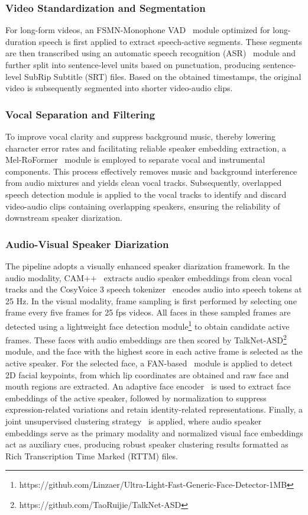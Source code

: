 \documentclass{article}
\begin{document}
\subsubsection{Video Standardization and Segmentation}
For long-form videos, an FSMN-Monophone VAD~\cite{VAD} module optimized for long-duration speech is first applied to extract speech-active segments. 
These segments are then transcribed using an automatic speech recognition (ASR)~\cite{FunASR} module and 
further split into sentence-level units based on punctuation, 
producing sentence-level SubRip Subtitle (SRT) files.
Based on the obtained timestamps, the original video is subsequently segmented into shorter video-audio clips.

\subsubsection{Vocal Separation and Filtering}
To improve vocal clarity and suppress background music, 
thereby lowering character error rates and facilitating reliable speaker embedding extraction, 
a Mel-RoFormer~\cite{Mel-RoFormer} module is employed to separate vocal and instrumental components. 
This process effectively removes music and background interference from audio mixtures and yields clean vocal tracks. 
Subsequently, overlapped speech detection module is applied to the vocal tracks 
to identify and discard video-audio clips containing overlapping speakers, 
ensuring the reliability of downstream speaker diarization.

\subsubsection{Audio-Visual Speaker Diarization}
The pipeline adopts a visually enhanced speaker diarization framework.
In the audio modality, CAM++~\cite{CAM++} extracts audio speaker embeddings from clean vocal tracks 
and the CosyVoice 3 speech tokenizer~\cite{CosyVoice3} encodes audio into speech tokens at 25 Hz.
In the visual modality, frame sampling is first performed by selecting one frame every five frames for 25 fps videos.
All faces in these sampled frames are detected
using a lightweight face detection module\footnote{https://github.com/Linzaer/Ultra-Light-Fast-Generic-Face-Detector-1MB}
to obtain candidate active frames.
These faces with audio embeddings are then scored by TalkNet-ASD\footnote{https://github.com/TaoRuijie/TalkNet-ASD} module, 
and the face with the highest score in each active frame is selected as the active speaker.
For the selected face, a FAN-based~\cite{FAN} module is applied to detect 2D facial keypoints, 
from which lip coordinates are obtained and raw face and mouth regions are extracted.
An adaptive face encoder~\cite{CurricularFace} is used to extract face embeddings of the active speaker, 
followed by normalization to suppress expression-related variations and retain identity-related representations.
Finally, a joint unsupervised clustering strategy~\cite{3D-Speaker} is applied, 
where audio speaker embeddings serve as the primary modality and 
normalized visual face embeddings act as auxiliary cues, 
producing robust speaker clustering results formatted as Rich Transcription Time Marked (RTTM) files.
\end{document}
